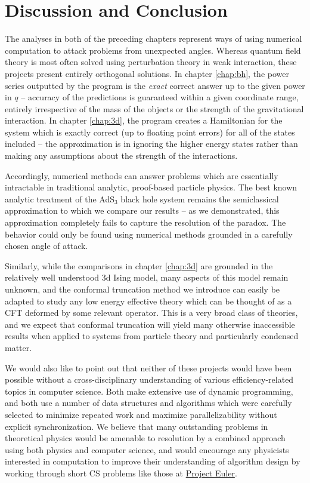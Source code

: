 \chapter{Discussion and Conclusion}
\label{chap:conclusion}

The analyses in both of the preceding chapters represent ways of using numerical
computation to attack problems from unexpected angles. Whereas quantum field 
theory is most often solved using perturbation theory in weak interaction, these
projects present entirely orthogonal solutions. In chapter \ref{chap:bh}, the 
power series outputted by the program is the \emph{exact} correct answer up to 
the given power in $q$ -- accuracy of the predictions is guaranteed within a 
given coordinate range, entirely irrespective of the mass of the objects or the 
strength of the gravitational interaction. In chapter \ref{chap:3d}, the program
creates a Hamiltonian for the system which is exactly correct (up to floating 
point errors) for all of the states included -- the approximation is in ignoring
the higher energy states rather than making any assumptions about the strength 
of the interactions.

Accordingly, numerical methods can answer problems which are essentially 
intractable in traditional analytic, proof-based particle physics. The best
known analytic treatment of the AdS$_3$ black hole system remains the 
semiclassical approximation to which we compare our results -- as we 
demonstrated, this approximation completely fails to capture the resolution of
the paradox. The behavior could only be found using numerical methods grounded
in a carefully chosen angle of attack.

Similarly, while the comparisons in chapter \ref{chap:3d} are grounded in the 
relatively well understood 3d Ising model, many aspects of this model remain 
unknown, and the conformal truncation method we introduce can easily be adapted 
to study any low energy effective theory which can be thought of as a CFT 
deformed by some relevant operator. This is a very broad class of theories, and 
we expect that conformal truncation will yield many otherwise inaccessible 
results when applied to systems from particle theory and particularly condensed 
matter.

We would also like to point out that neither of these projects would have been
possible without a cross-disciplinary understanding of various 
efficiency-related topics in computer science. Both make extensive use of 
dynamic programming, and both use a number of data structures and algorithms 
which were carefully selected to minimize repeated work and maximize 
parallelizability without explicit synchronization. We believe that many
outstanding problems in theoretical physics would be amenable to resolution by
a combined approach using both physics and computer science, and would encourage
any physicists interested in computation to improve their understanding of 
algorithm design by working through short CS problems like those at 
\href{https://projecteuler.net}{Project Euler}.

